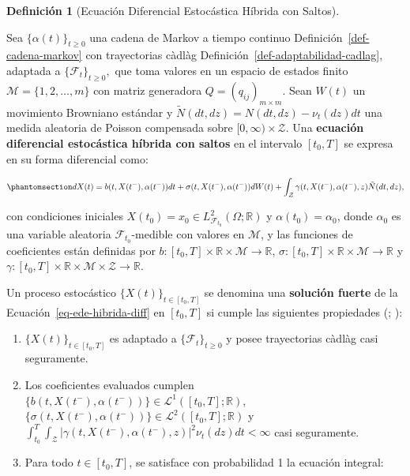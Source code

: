 \documentclass[
  spanish,
  letterpaper,
  DIV=11,
  numbers=noendperiod]{scrreprt}
\providecommand{\tightlist}{%
  \setlength{\itemsep}{0pt}\setlength{\parskip}{0pt}}
\theoremstyle{plain}
\theoremstyle{plain}
\theoremstyle{plain}
\theoremstyle{definition}
\newtheorem{definition}{Definición}[chapter]
\theoremstyle{remark}
\begin{document}
\begin{definition}[Ecuación Diferencial Estocástica Híbrida con
Saltos]\protect\hypertarget{def-ede-hibrida}{}\label{def-ede-hibrida}

Sea \(\{\alpha(t)\}_{t \ge 0}\) una cadena de Markov a tiempo continuo
Definición~\ref{def-cadena-markov} con trayectorias càdlàg
Definición~\ref{def-adaptabilidad-cadlag}, adaptada a
\(\{\mathcal{F}_t\}_{t \ge 0},\) que toma valores en un espacio de
estados finito \(\mathcal{M} = \{1, 2, \dots, m\}\) con matriz
generadora \(Q = (q_{ij})_{m \times m}.\) Sean \(W(t)\) un movimiento
Browniano estándar y \(\tilde{N}(dt, dz) = N(dt, dz) - \nu_t(dz)dt\) una
medida aleatoria de Poisson compensada sobre
\([0, \infty) \times \mathcal{Z}.\) Una \textbf{ecuación diferencial
estocástica híbrida con saltos} en el intervalo \([t_0, T]\) se expresa
en su forma diferencial como:

\begin{equation}\phantomsection\label{eq-ede-hibrida-diff}{
dX(t) = b(t, X(t^-), \alpha(t^-)) dt + \sigma(t, X(t^-), \alpha(t^-)) dW(t) + \int_{\mathcal{Z}} \gamma(t, X(t^-), \alpha(t^-), z) \tilde{N}(dt, dz),
}\end{equation}

con condiciones iniciales
\(X(t_0) = x_0 \in L^2_{\mathcal{F}_{t_0}}(\Omega; \mathbb{R})\) y
\(\alpha(t_0) = \alpha_0\), donde \(\alpha_0\) es una variable aleatoria
\(\mathcal{F}_{t_0}\)-medible con valores en \(\mathcal{M}\), y las
funciones de coeficientes están definidas por
\(b: [t_0, T] \times \mathbb{R} \times \mathcal{M} \to \mathbb{R}\),
\(\sigma: [t_0, T] \times \mathbb{R} \times \mathcal{M} \to \mathbb{R}\)
y
\(\gamma: [t_0, T] \times \mathbb{R} \times \mathcal{M} \times \mathcal{Z} \to \mathbb{R}\).

Un proceso estocástico \(\{X(t)\}_{t \in [t_0, T]}\) se denomina una
\textbf{solución fuerte} de la Ecuación~\ref{eq-ede-hibrida-diff} en
\([t_0, T]\) si cumple las siguientes propiedades
(;
):

\begin{enumerate}
\def\labelenumi{\arabic{enumi}.}
\tightlist
\item
  \(\{X(t)\}_{t \in [t_0, T]}\) es adaptado a
  \(\{\mathcal{F}_t\}_{t \ge 0}\) y posee trayectorias càdlàg casi
  seguramente.
\item
  Los coeficientes evaluados cumplen
  \(\{b(t, X(t^-), \alpha(t^-))\} \in \mathcal{L}^1([t_0, T]; \mathbb{R})\),
  \(\{\sigma(t, X(t^-), \alpha(t^-))\} \in \mathcal{L}^2([t_0, T]; \mathbb{R})\)
  y
  \(\displaystyle \int_{t_0}^T \int_{\mathcal{Z}} \vert \gamma(t, X(t^-), \alpha(t^-), z) \vert^2 \nu_t(dz) dt < \infty\)
  casi seguramente.
\item
  Para todo \(t \in [t_0, T]\), se satisface con probabilidad 1 la
  ecuación integral:
\end{enumerate}


\end{definition}
\end{document}
